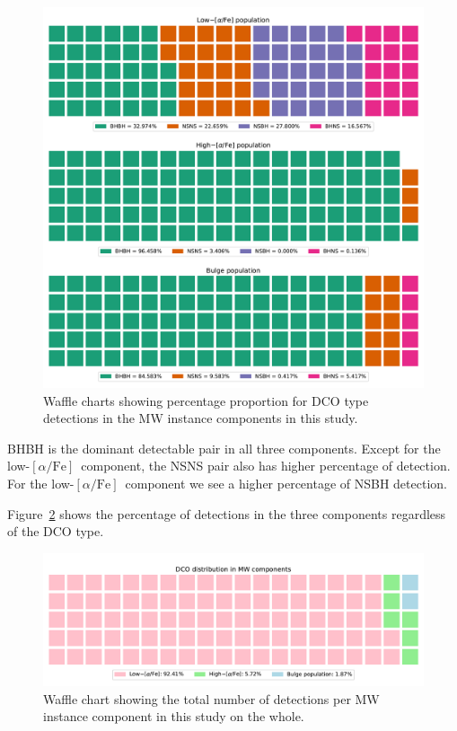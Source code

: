 \documentclass[twocolumn, twocolappendix]{aastex63}
\newcommand{\lowalpha}{low-$[\alpha/\text{Fe}]$}
\begin{document}
\begin{figure}[!h]%
	\centering
	\includegraphics[width=\columnwidth]{analysis_data/004__images_for_latex/dco_type_MW_component_distribution}
	\caption{Waffle charts showing percentage proportion for DCO type detections in the MW instance components in this study.}
	\label{fig:dcotypemwcomponentdistributioncropped}
\end{figure}%


BHBH is the dominant detectable pair in all three components.
Except for the \lowalpha\ component, the NSNS pair also has higher percentage of detection.
For the \lowalpha\ component we see a higher percentage of NSBH detection.

Figure~\ref{fig:dcotypemwdistribution} shows the percentage of detections in the three components regardless of the DCO type.

\begin{figure}[!h]%
	\centering
	\includegraphics[width=\columnwidth]{analysis_data/004__images_for_latex/dco_type_MW_distribution}
	\caption{Waffle chart showing the total number of detections per MW instance component in this study on the whole.}
	\label{fig:dcotypemwdistribution}
\end{figure}%
\end{document}
